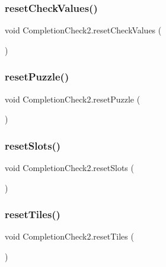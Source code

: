 \subsubsection{\texorpdfstring{reset\+Check\+Values()}{resetCheckValues()}}
{\footnotesize\ttfamily void Completion\+Check2.\+reset\+Check\+Values (\begin{DoxyParamCaption}{ }\end{DoxyParamCaption})}

\mbox{\label{class_completion_check2_aa06cef9b95d2f9c4bbb498f6c9efac1e}} 
\subsubsection{\texorpdfstring{reset\+Puzzle()}{resetPuzzle()}}
{\footnotesize\ttfamily void Completion\+Check2.\+reset\+Puzzle (\begin{DoxyParamCaption}{ }\end{DoxyParamCaption})}

\mbox{\label{class_completion_check2_a35ed56dc84b27430bdacabc119985ec5}} 
\subsubsection{\texorpdfstring{reset\+Slots()}{resetSlots()}}
{\footnotesize\ttfamily void Completion\+Check2.\+reset\+Slots (\begin{DoxyParamCaption}{ }\end{DoxyParamCaption})}

\mbox{\label{class_completion_check2_a16a374ffbff900932f113dad066d27e4}} 
\subsubsection{\texorpdfstring{reset\+Tiles()}{resetTiles()}}
{\footnotesize\ttfamily void Completion\+Check2.\+reset\+Tiles (\begin{DoxyParamCaption}{ }\end{DoxyParamCaption})}



